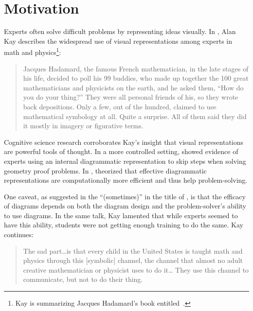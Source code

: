 \section{Motivation}
\label{sec:motivation}

Experts often solve difficult problems by representing ideas visually. In , Alan Kay describes the widespread use of visual representations among experts in math and physics\footnote{Kay is summarizing Jacques Hadamard's book entitled~\cite{hadamard_mathematicians_1945}.}:

\begin{quote}
Jacques Hadamard, the famous French mathematician, in the late stages of his life, decided to poll his 99 buddies, who made up together the 100 great mathematicians and physicists on the earth, and he asked them, ``How do you do your thing?'' They were all personal friends of his, so they wrote back depositions. Only a few, out of the hundred, claimed to use mathematical symbology at all. Quite a surprise. All of them said they did it mostly in imagery or figurative terms.\cite[52:43]{doingWithImages}
\end{quote}

Cognitive science research corroborates Kay's insight that visual representations are powerful tools of thought. In a more controlled setting,  \citet{perceptualChunks} showed evidence of experts using an internal diagrammatic representation to skip steps when solving geometry proof problems. In , \citet{whyDiagramWorth} theorized that effective diagrammatic representations are computationally more efficient and thus help problem-solving.

One caveat, as suggested in the ``(sometimes)'' in the title of \cite{whyDiagramWorth}, is that the efficacy of diagrams depends on both the diagram design and the problem-solver's ability to use diagrams. In the same talk, Kay lamented that while experts seemed to have this ability, students were not getting enough training to do the same.  Kay continues:

\begin{quote}
    The sad part\dots{}is that every child in the United States is taught math and physics through this [symbolic] channel, the channel that almost no adult creative mathematician or physicist uses to do it\dots{} They use this channel to communicate, but not to do their thing.~\cite[54:36]{doingWithImages}
\end{quote}

